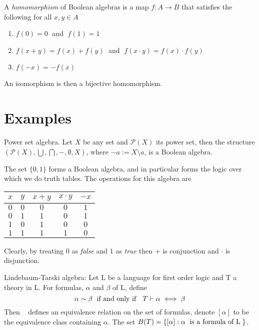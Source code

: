 \documentclass[12pt]{article}
\begin{document}
\begin{definition}
A \textit{homomorphism} of Boolean algebras is a map $f: A\longrightarrow B$ that satisfies the following for all $x,y\in A$
\begin{enumerate}
    \item[] $f(0)=0\;$ and $\;f(1)=1$
    \item[] $f(x+y)=f(x)+f(y)\;$ and $\;f(x\cdot y)=f(x)\cdot f(y)$
    \item[] $f(-x)=-f(x)$
\end{enumerate}
\end{definition}
An isomorphism is then a bijective homomorphism.

\section{Examples}

\begin{example}
Power set algebra. Let $X$ be any set and $\mathcal{P}(X)$ its power set, then the structure $\left(\mathcal{P}(X),\bigcup,\bigcap,-,\emptyset,X\right)$, where $-a:=X\setminus a$, is a Boolean algebra.
\end{example}

\begin{example}
The set $\{0,1\}$ forms a Boolean algebra, and in particular forms the logic over which we do truth tables. The operations for this algebra are
\end{example}

\begin{tabular}{c c | c c c}
$x$ & $y$ & $x+y$ & $x\cdot y$ & $-x$\\
\hline
$0$ & $0$ & $0$ &$0$&$1$\\
$0$&$1$&$1$&$0$&$1$\\
$1$&$0$&$1$&$0$&$0$\\
$1$&$1$&$1$&$1$&$0$
\end{tabular}

Clearly, by treating $0$ as \textit{false} and $1$ as \textit{true} then $+$ is conjunction and $\cdot$ is disjunction.

\begin{example}
Lindebaum-Tarski algebra: Let L be a language for first order logic and T a theory in L. For formulas, $\alpha$ and $\beta$ of L, define
$$
\alpha \sim \beta \text{\;  if and only if \; } T\vdash \alpha \iff \beta
$$
Then ~ defines an equivalence relation on the set of formulas, denote $[\alpha]$ to be the equivalence class containing $\alpha$. The set $B(T)=\{[\alpha]: \alpha \text{\; is a formula of L\;}\}$.
\end{example}
\end{document}
